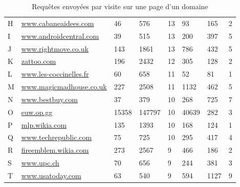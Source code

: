 \begin{table}[]
\begin{tabular}{llllllll}
H & \scriptsize \url{www.cabaneaidees.com}       & 46                    & 576           & 13                   & 93                       & 165          & 2              \\
I & \scriptsize \url{www.androidcentral.com}     & 39                    & 515           & 13                   & 200                      & 397          & 5              \\
J & \scriptsize \url{www.rightmove.co.uk}        & 143                   & 1861          & 13                   & 786                      & 432          & 5              \\
K & \scriptsize \url{zattoo.com}                 & 196                   & 2432          & 12                   & 305                      & 128          & 2              \\
L & \scriptsize \url{www.les-coccinelles.fr}     & 60                    & 658           & 11                   & 52                       & 81           & 1              \\
M & \scriptsize \url{www.magicmadhouse.co.uk}    & 227                   & 2508          & 11                   & 1132                     & 462          & 5              \\
N & \scriptsize \url{www.bestbuy.com}            & 37                    & 379           & 10                   & 268                      & 725          & 7              \\
O & \scriptsize \url{euw.op.gg}                  & 15358                 & 147797        & 10                   & 40639                    & 282          & 3              \\
P & \scriptsize \url{mlp.wikia.com}              & 135                   & 1393          & 10                   & 168                      & 124          & 1              \\
Q & \scriptsize \url{www.techrepublic.com}       & 75                    & 725           & 10                   & 295                      & 417          & 4              \\
R & \scriptsize \url{fireemblem.wikia.com}       & 273                   & 2567          & 9                    & 466                      & 186          & 2              \\
S & \scriptsize \url{www.upc.ch}                 & 70                    & 656           & 9                    & 244                      & 381          & 3              \\
T & \scriptsize \url{www.usatoday.com}           & 63                    & 540           & 9                    & 594                      & 1127         & 9              \\       
\end{tabular}
\caption{Requêtes envoyées par visite sur une page d'un domaine}
\label{trackers-2}
\end{table}

